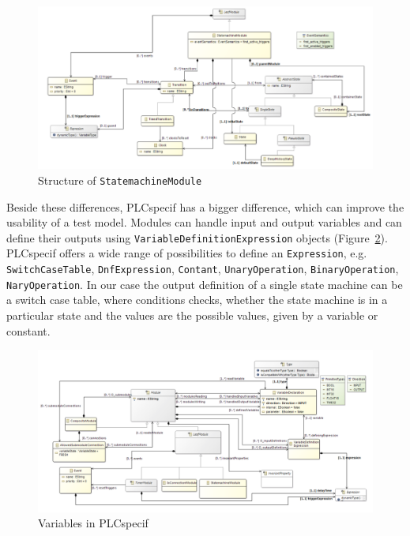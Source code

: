 \begin{figure}[htp]
\centering
\includegraphics[scale=0.5]{figures/plchsm_statemachine}
\caption{Structure of \texttt{StatemachineModule} \cite{plcspecif}}
\label{fig:plchsm_statemachine}
\end{figure}

Beside these differences, PLCspecif has a bigger difference, which can improve the usability of a test model. Modules can handle input and output variables and can define their outputs using \texttt{VariableDefinitionExpression} objects (Figure~\ref{fig:plchsm_variables}). PLCspecif offers a wide range of possibilities to define an \texttt{Expression}, e.g. \texttt{SwitchCaseTable}, \texttt{DnfExpression}, \texttt{Contant}, \texttt{UnaryOperation}, \texttt{BinaryOperation}, \texttt{NaryOperation}. In our case the output definition of a single state machine can be a switch case table, where conditions checks, whether the state machine is in a particular state and the values are the possible values, given by a variable or constant.

\begin{figure}[htp]
\centering
\includegraphics[scale=0.6]{figures/plchsm_variables}
\caption{Variables in PLCspecif \cite{plcspecif}}
\label{fig:plchsm_variables}
\end{figure}

